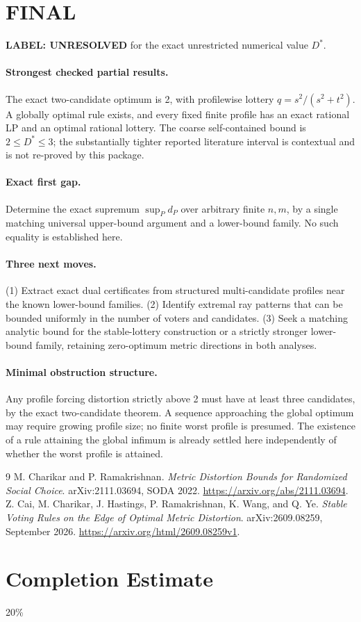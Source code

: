 \documentclass[11pt,a4paper]{article}
\theoremstyle{definition}
\theoremstyle{remark}
\begin{document}
\section{FINAL}
\textbf{LABEL: UNRESOLVED} for the exact unrestricted numerical value $D^*$.

\paragraph{Strongest checked partial results.}
The exact two-candidate optimum is 2, with profilewise lottery $q=s^2/(s^2+t^2)$. A globally optimal rule exists, and every fixed finite profile has an exact rational LP and an optimal rational lottery. The coarse self-contained bound is $2\leq D^*\leq3$; the substantially tighter reported literature interval is contextual and is not re-proved by this package.

\paragraph{Exact first gap.}
Determine the exact supremum $\sup_P d_P$ over arbitrary finite $n,m$, by a single matching universal upper-bound argument and a lower-bound family. No such equality is established here.

\paragraph{Three next moves.}
(1) Extract exact dual certificates from structured multi-candidate profiles near the known lower-bound families. (2) Identify extremal ray patterns that can be bounded uniformly in the number of voters and candidates. (3) Seek a matching analytic bound for the stable-lottery construction or a strictly stronger lower-bound family, retaining zero-optimum metric directions in both analyses.

\paragraph{Minimal obstruction structure.}
Any profile forcing distortion strictly above 2 must have at least three candidates, by the exact two-candidate theorem. A sequence approaching the global optimum may require growing profile size; no finite worst profile is presumed. The existence of a rule attaining the global infimum is already settled here independently of whether the worst profile is attained.

\begin{thebibliography}{9}
 M. Charikar and P. Ramakrishnan. \emph{Metric Distortion Bounds for Randomized Social Choice}. arXiv:2111.03694, SODA 2022. \url{https://arxiv.org/abs/2111.03694}.
 Z. Cai, M. Charikar, J. Hastings, P. Ramakrishnan, K. Wang, and Q. Ye. \emph{Stable Voting Rules on the Edge of Optimal Metric Distortion}. arXiv:2609.08259, September 2026. \url{https://arxiv.org/html/2609.08259v1}.
\end{thebibliography}

\section{Completion Estimate}
20\%
\end{document}
